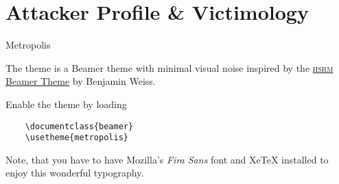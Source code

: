 \section{Attacker Profile \& Victimology}

\begin{frame}[fragile]{Metropolis}

  The \themename theme is a Beamer theme with minimal visual \cite{Knuth92} noise
  inspired\cite{ConcreteMath1} by the \href{https://github.com/hsrmbeamertheme/hsrmbeamertheme}{\textsc{hsrm} Beamer
  Theme} by Benjamin Weiss.

  Enable the theme by loading \cite{ConcreteMath}

  \begin{verbatim}    \documentclass{beamer}
    \usetheme{metropolis}\end{verbatim}

  Note, that you have to have Mozilla's \emph{Fira Sans} font and XeTeX
  installed to enjoy\cite{homerSimpson} this wonderful typography.
\end{frame}